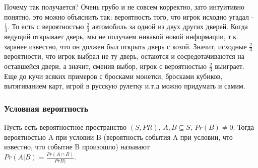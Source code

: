 Почему так получается? Очень грубо и не совсем корректно, зато интуитивно понятно, это можно объяснить так: вероятность того, что игрок исходно угадал - $\frac{1}{3}$. То есть с вероятностью $\frac{2}{3}$ автомобиль за одной из двух других дверей. Когда ведущий открывает дверь, мы не получаем никакой новой информации, т.к. заранее известно, что он должен был открыть дверь с козой. Значит, исходные $\frac{2}{3}$ вероятности, что игрок выбрал не ту дверь, остаются и сосредотачиваются на оставшейся двери, а значит, сменив выбор, игрок с вероятностью $\frac{2}{3}$ выиграет.\\
Еще до кучи всяких примеров с бросками монетки, бросками кубиков, вытягиванием карт, игрой в русскую рулетку и.т.д можно придумать и самим.
\subsubsection{Условная вероятность}
Пусть есть вероятностное пространство $(S, PR)$, $A, B \subseteq S$, $Pr(B) \not= 0$. Тогда вероятностью A при условии B (вероятность события A при условии, что известно, что событие B произошло) называют \\
$Pr(A|B) = \frac{Pr(A \cap B)}{Pr{B})}$.\\
